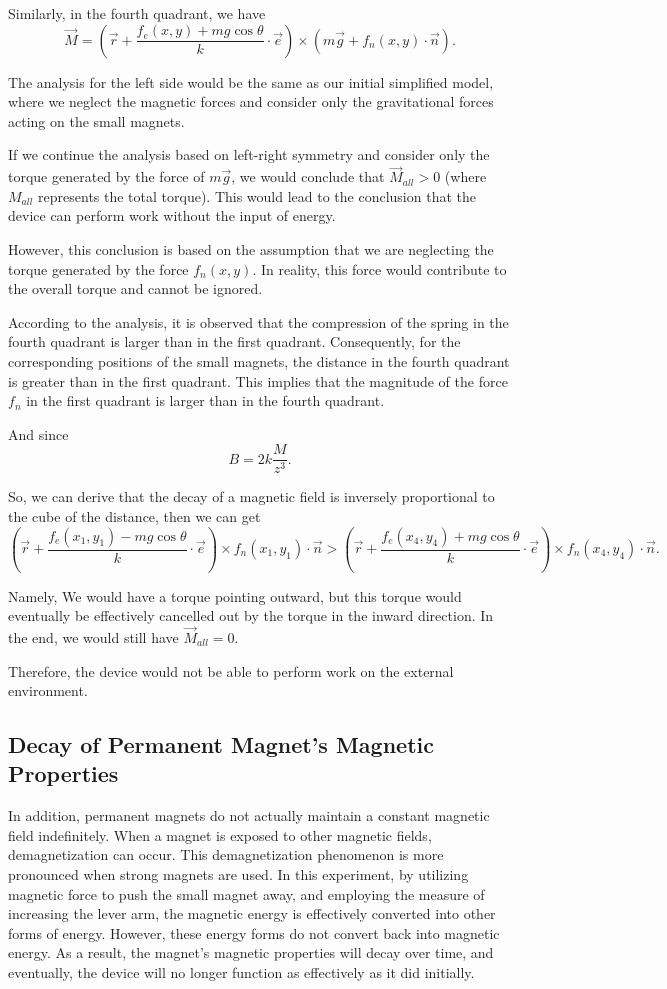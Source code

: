 \documentclass[12pt]{article}
\begin{document}
Similarly, in the fourth quadrant, we have
$$
\vec{M} = ( \vec{r}+\frac{f_e(x,y) + mg \cos{\theta}}{k}\cdot\vec{e})\times (m\vec{g} + f_n(x,y)\cdot\vec{n}).
$$

The analysis for the left side would be the same as our initial simplified model, where we neglect the magnetic forces and consider only the gravitational forces acting on the small magnets.

If we continue the analysis based on left-right symmetry and consider only the torque generated by the force of $m\vec{g}$, we would conclude that $\vec{M}_{all}>0$ (where $M_{all}$ represents the total torque). This would lead to the conclusion that the device can perform work without the input of energy.

However, this conclusion is based on the assumption that we are neglecting the torque generated by the force $f_n(x,y)$. In reality, this force would contribute to the overall torque and cannot be ignored.

According to the analysis, it is observed that the compression of the spring in the fourth quadrant is larger than in the first quadrant. Consequently, for the corresponding positions of the small magnets, the distance in the fourth quadrant is greater than in the first quadrant. This implies that the magnitude of the force $f_n$ in the first quadrant is larger than in the fourth quadrant.

And since
$$
B = 2k\frac{M}{z^3}.
$$

So, we can derive that the decay of a magnetic field is inversely proportional to the cube of the distance, then we can get
$$
( \vec{r}+ \frac{f_e(x_1,y_1) - mg \cos{\theta}}{k}\cdot\vec{e})\times f_n(x_1,y_1)\cdot\vec{n} > ( \vec{r}+ \frac{f_e(x_4,y_4) + mg \cos{\theta}}{k}\cdot\vec{e})\times f_n(x_4,y_4)\cdot\vec{n}.
$$

Namely, We would have a torque pointing outward, but this torque would eventually be effectively cancelled out by the torque in the inward direction. In the end, we would still have $\vec{M}_{all} = 0$.

Therefore, the device would not be able to perform work on the external environment.

\subsection{Decay of Permanent Magnet's Magnetic Properties}
In addition, permanent magnets do not actually maintain a constant magnetic field indefinitely. When a magnet is exposed to other magnetic fields, demagnetization can occur. This demagnetization phenomenon is more pronounced when strong magnets are used. In this experiment, by utilizing magnetic force to push the small magnet away, and employing the measure of increasing the lever arm, the magnetic energy is effectively converted into other forms of energy. However, these energy forms do not convert back into magnetic energy. As a result, the magnet's magnetic properties will decay over time, and eventually, the device will no longer function as effectively as it did initially.
\end{document}

